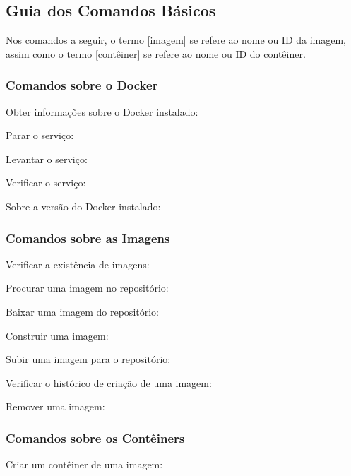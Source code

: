 \documentclass[a4paper,11pt]{article}
\begin{document}
\subsection{Guia dos Comandos Básicos}
Nos comandos a seguir, o termo [imagem] se refere ao nome ou ID da imagem, assim como o termo [contêiner] se refere ao nome ou ID do contêiner.

\subsubsection{Comandos sobre o Docker}
Obter informações sobre o Docker instalado: \\

Parar o serviço: \\

Levantar o serviço: \\

Verificar o serviço: \\

Sobre a versão do Docker instalado: \\

\subsubsection{Comandos sobre as Imagens}
Verificar a existência de imagens: \\

Procurar uma imagem no repositório: \\

Baixar uma imagem do repositório: \\

Construir uma imagem: \\

Subir uma imagem para o repositório: \\

Verificar o histórico de criação de uma imagem: \\

Remover uma imagem: \\

\subsubsection{Comandos sobre os Contêiners}
Criar um contêiner de uma imagem: \\
\end{document}
